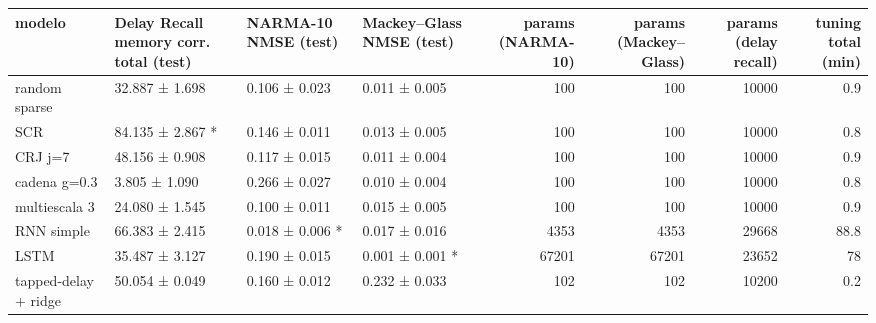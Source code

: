 \begin{tabular}{llllrrrr}
\toprule
modelo & Delay Recall memory corr. total (test) & NARMA-10 NMSE (test) & Mackey–Glass NMSE (test) & params (NARMA-10) & params (Mackey–Glass) & params (delay recall) & tuning total (min) \\
\midrule
random sparse & 32.887 ± 1.698 & 0.106 ± 0.023 & 0.011 ± 0.005 & 100 & 100 & 10000 & 0.9 \\
SCR & 84.135 ± 2.867 * & 0.146 ± 0.011 & 0.013 ± 0.005 & 100 & 100 & 10000 & 0.8 \\
CRJ j=7 & 48.156 ± 0.908 & 0.117 ± 0.015 & 0.011 ± 0.004 & 100 & 100 & 10000 & 0.9 \\
cadena g=0.3 & 3.805 ± 1.090 & 0.266 ± 0.027 & 0.010 ± 0.004 & 100 & 100 & 10000 & 0.8 \\
multiescala 3 & 24.080 ± 1.545 & 0.100 ± 0.011 & 0.015 ± 0.005 & 100 & 100 & 10000 & 0.9 \\
RNN simple & 66.383 ± 2.415 & 0.018 ± 0.006 * & 0.017 ± 0.016 & 4353 & 4353 & 29668 & 88.8 \\
LSTM & 35.487 ± 3.127 & 0.190 ± 0.015 & 0.001 ± 0.001 * & 67201 & 67201 & 23652 & 78 \\
tapped-delay + ridge & 50.054 ± 0.049 & 0.160 ± 0.012 & 0.232 ± 0.033 & 102 & 102 & 10200 & 0.2 \\
\bottomrule
\end{tabular}
